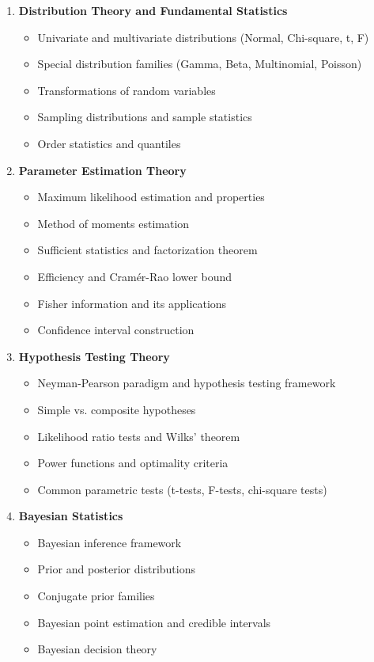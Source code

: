 \documentclass[12pt,a4paper]{article}
\theoremstyle{remark}
\begin{document}
\begin{enumerate}
\item \textbf{Distribution Theory and Fundamental Statistics}
   \begin{itemize}
   \item Univariate and multivariate distributions (Normal, Chi-square, t, F)
   \item Special distribution families (Gamma, Beta, Multinomial, Poisson)
   \item Transformations of random variables
   \item Sampling distributions and sample statistics
   \item Order statistics and quantiles
   \end{itemize}

\item \textbf{Parameter Estimation Theory}
   \begin{itemize}
   \item Maximum likelihood estimation and properties
   \item Method of moments estimation
   \item Sufficient statistics and factorization theorem
   \item Efficiency and Cramér-Rao lower bound
   \item Fisher information and its applications
   \item Confidence interval construction
   \end{itemize}

\item \textbf{Hypothesis Testing Theory}
   \begin{itemize}
   \item Neyman-Pearson paradigm and hypothesis testing framework
   \item Simple vs. composite hypotheses
   \item Likelihood ratio tests and Wilks' theorem
   \item Power functions and optimality criteria
   \item Common parametric tests (t-tests, F-tests, chi-square tests)
   \end{itemize}

\item \textbf{Bayesian Statistics}
   \begin{itemize}
   \item Bayesian inference framework
   \item Prior and posterior distributions
   \item Conjugate prior families
   \item Bayesian point estimation and credible intervals
   \item Bayesian decision theory
   \end{itemize}


\end{enumerate}
\end{document}
